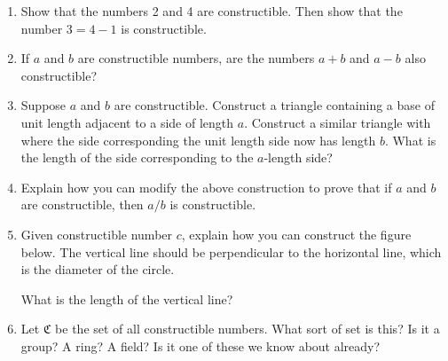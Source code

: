 \documentclass[12pt]{article}
\theoremstyle{plain}
\theoremstyle{definition}
\theoremstyle{remark}
\begin{document}
\begin{enumerate}
\item Show that the numbers 2 and 4 are constructible.  Then show that the number $3 = 4 - 1$ is constructible.

\item If $a$ and $b$ are constructible numbers, are the numbers $a+b$ and $a-b$ also constructible?  

\item Suppose $a$ and $b$ are constructible.  Construct a triangle containing a base of unit length adjacent to a side of length $a$.  Construct a similar triangle with where the side corresponding the unit length side now has length $b$.  What is the length of the side corresponding to the $a$-length side?

\item Explain how you can modify the above construction to prove that if $a$ and $b$ are constructible, then $a/b$ is constructible.

\item Given constructible number $c$, explain how you can construct the figure below.  The vertical line should be perpendicular to the horizontal line, which is the diameter of the circle.  

\begin{center}
\end{center}

What is the length of the vertical line?

\item Let $\mathfrak C$ be the set of all constructible numbers.  What sort of set is this?  Is it a group?  A ring?  A field?  Is it one of these we know about already?
\end{enumerate}
\end{document}
